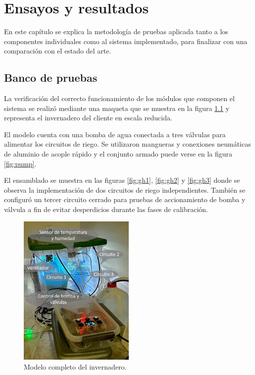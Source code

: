 
\chapter{Ensayos y resultados} %

\label{Chapter4} %

En este capítulo se explica la metodología de pruebas aplicada tanto a los componentes individuales como al sistema implementado, para finalizar con una comparación con el estado del arte.


\section{Banco de pruebas}
\label{sec:Banco de pruebas}
%
La verificación del correcto funcionamiento de los módulos que componen el sistema se realizó mediante una maqueta que se muestra en la figura \ref{fig:maqueta} y representa el invernadero del cliente en escala reducida.

El modelo cuenta con una bomba de agua conectada a tres válvulas para alimentar los circuitos de riego. 
Se utilizaron mangueras y conexiones neumáticas de aluminio de acople rápido y el conjunto armado puede verse en la figura \ref{fig:pump}. 
  
El ensamblado se muestra en las figuras \ref{fig:gh1}, \ref{fig:gh2} y \ref{fig:gh3} donde se observa la implementación de dos circuitos de riego independientes. También se configuró un tercer circuito cerrado para pruebas de accionamiento de bomba y válvula a fin de evitar desperdicios durante las fases de calibración.


\begin{figure}[h]
	\centering
	\includegraphics[width=0.50\textwidth]{./Figures/chapter4/maqueta.jpg}
	\caption[Modelo completo del invernadero]{Modelo completo del invernadero.}
	\label{fig:maqueta}
\end{figure}

